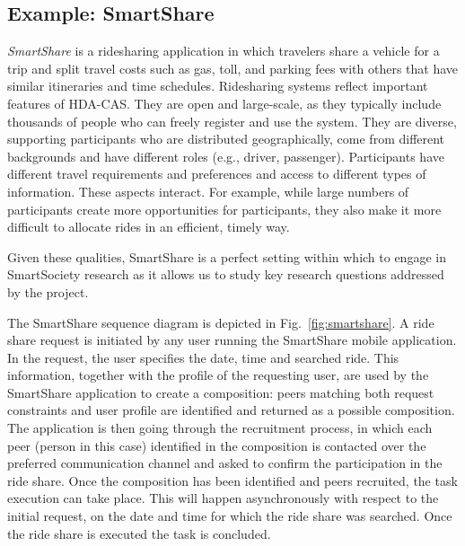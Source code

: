 \subsection{Example: SmartShare}
\textit{SmartShare} is a ridesharing application in which travelers share a vehicle for a trip and split travel costs such as gas, toll, and parking fees with others that have similar itineraries and time schedules. 
Ridesharing systems reflect important features of HDA-CAS. They are open and large-scale, as they typically include thousands of people who can freely register and use the system. They are diverse, supporting participants who are distributed geographically, come from different backgrounds and have different roles (e.g., driver, passenger). Participants have different travel requirements and preferences and access to different types of information. These aspects interact. For example, while large numbers of participants create more opportunities for participants, they also make it more difficult to allocate rides in an efficient, timely way.
 
Given these qualities, SmartShare is a perfect setting within which to engage in SmartSociety research as it allows us to study key research questions addressed by the project.

The SmartShare sequence diagram is depicted in Fig.~\ref{fig:smartshare}. A ride share request is initiated by any user running the SmartShare mobile application. In the request, the user specifies the date, time and searched ride. This information, together with the profile of the requesting user, are used by the SmartShare application to create a composition: peers matching both request constraints and user profile are identified and returned as a possible composition. The application is then going through the recruitment process, in which each peer (person in this case) identified in the composition is contacted over the preferred communication channel and asked to confirm the participation in the ride share. Once the composition has been identified and peers recruited, the task execution can take place. This will happen asynchronously with respect to the initial request, on the date and time for which the ride share was searched. Once the ride share is executed the task is concluded.  

